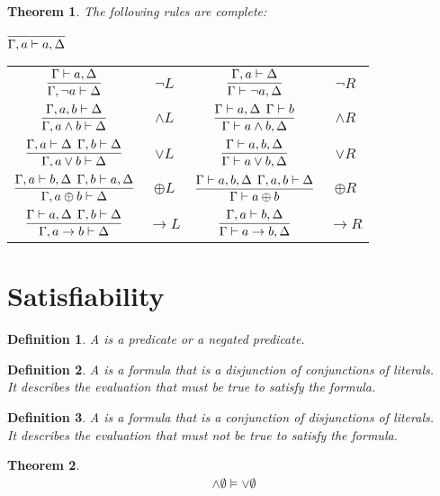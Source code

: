 \documentclass{article}
\theoremstyle{sltheorem}
\newtheorem{definition}{Definition}
\newtheorem{theorem}{Theorem}
\begin{document}
\begin{theorem}
    The following rules are complete:
    \begin{center}
        $\infer{\Gamma, a \vdash a, \Delta}{}$\\
    {\renewcommand{\arraystretch}{3}
    \begin{tabular}{c c c c}
           $\vcenter{\infer{\Gamma,\neg a\vdash \Delta}{\Gamma\vdash a, \Delta}}$ 
           &$\neg L$
           &$\vcenter{\infer{\Gamma\vdash \neg a, \Delta}{\Gamma, a\vdash \Delta}}$ 
           &$\neg R$\\
           $\vcenter{\infer{\Gamma, a\wedge b\vdash \Delta}{\Gamma, a, b\vdash \Delta}}$ 
           &$\wedge L$
           &$\vcenter{\infer{\Gamma\vdash a\wedge b, \Delta}{\Gamma\vdash a, \Delta\:\: \Gamma\vdash b}}$ 
           &$\wedge R$\\
           $\vcenter{\infer{\Gamma, a\vee b\vdash \Delta}{\Gamma,a\vdash \Delta\:\:\Gamma,b\vdash\Delta}}$ 
           &$\vee L$
           &$\vcenter{\infer{\Gamma\vdash a\vee b,\Delta}{\Gamma\vdash a,b,\Delta}}$ 
           &$\vee R$\\
           $\vcenter{\infer{\Gamma, a\oplus b\vdash\Delta}{\Gamma, a\vdash b, \Delta\:\:\Gamma, b\vdash a,\Delta}}$
           &$\oplus L$
           &$\vcenter{\infer{\Gamma\vdash a\oplus b}{\Gamma\vdash a,b,\Delta\:\:\Gamma,a,b\vdash \Delta}}$
           &$\oplus R$\\
           $\vcenter{\infer{\Gamma, a\to b\vdash \Delta}{\Gamma\vdash a,\Delta\:\:\Gamma, b\vdash \Delta}}$
           &$\to L$
           &$\vcenter{\infer{\Gamma\vdash a\to b, \Delta}{\Gamma,a\vdash b,\Delta}}$
           &$\to R$
    \end{tabular}
    }
    \end{center}
\end{theorem}
\section{Satisfiability}
\begin{definition}
    A  is a predicate or a negated predicate.
\end{definition}
\begin{definition}
    A  is a formula that is a disjunction of conjunctions of literals.\\
    It describes the evaluation that must be true to satisfy the formula.
\end{definition}
\begin{definition}
    A  is a formula that is a conjunction of disjunctions of literals.\\
    It describes the evaluation that must not be true to satisfy the formula.
\end{definition}
\begin{theorem}
    \begin{gather*}
        \wedge \emptyset\vDash\vee\emptyset
    \end{gather*}
\end{theorem}
\end{document}
